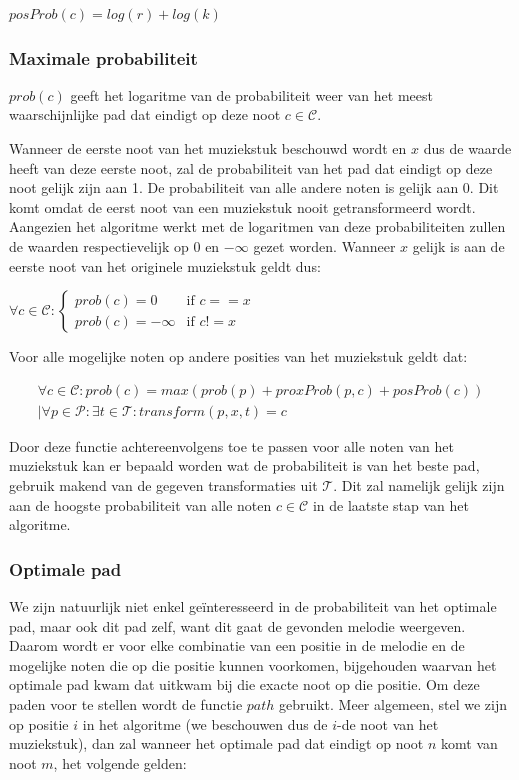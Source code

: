 \begin{framed}
\noindent
$posProb(c)=log(r) + log(k)$
\end{framed}

\subsubsection{Maximale probabiliteit}
$prob(c)$ geeft het logaritme van de probabiliteit weer van het meest waarschijnlijke pad dat eindigt op deze noot $c\in \mathcal{C}$.

Wanneer de eerste noot van het muziekstuk beschouwd wordt en $x$ dus de waarde heeft van deze eerste noot, zal de probabiliteit van het pad dat eindigt op deze noot gelijk zijn aan 1. De probabiliteit van alle andere noten is gelijk aan 0. Dit komt omdat de eerst noot van een muziekstuk nooit getransformeerd wordt. Aangezien het algoritme werkt met de logaritmen van deze probabiliteiten zullen de waarden respectievelijk op 0 en $-\infty$ gezet worden. Wanneer $x$ gelijk is aan de eerste noot van het originele muziekstuk geldt dus:

\begin{framed}
\noindent
$\forall c\in \mathcal{C}: \begin{cases} 
prob(c)=0 &\mbox{if } c==x\\ 
prob(c)=-\infty &\mbox{if } c!=x \end{cases}$
\end{framed}

Voor alle mogelijke noten op andere posities van het muziekstuk geldt dat:

\begin{framed}
\noindent
\begin{multline}
\forall c\in \mathcal{C}: 
prob(c) = max(prob(p) + proxProb(p,c) + posProb(c)) \\
| \forall p\in \mathcal{P}: \exists t\in \mathcal{T}: transform(p,x,t)=c
\end{multline}
\end{framed}

Door deze functie achtereenvolgens toe te passen voor alle noten van het muziekstuk kan er bepaald worden wat de probabiliteit is van het beste pad, gebruik makend van de gegeven transformaties uit $\mathcal{T}$. Dit zal namelijk gelijk zijn aan de hoogste probabiliteit van alle noten $c\in \mathcal{C}$ in de laatste stap van het algoritme.

\subsubsection{Optimale pad}
We zijn natuurlijk niet enkel ge\"interesseerd in de probabiliteit van het optimale pad, maar ook dit pad zelf, want dit gaat de gevonden melodie weergeven. Daarom wordt er voor elke combinatie van een positie in de melodie en de mogelijke noten die op die positie kunnen voorkomen, bijgehouden waarvan het optimale pad kwam dat uitkwam bij die exacte noot op die positie. Om deze paden voor te stellen wordt de functie $path$ gebruikt. Meer algemeen, stel we zijn op positie $i$ in het algoritme (we beschouwen dus de $i$-de noot van het muziekstuk), dan zal wanneer het optimale pad dat eindigt op noot $n$ komt van noot $m$, het volgende gelden:

